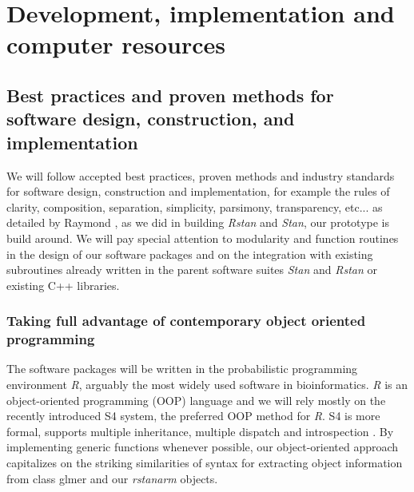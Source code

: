 \documentclass[11pt,notitlepage]{article}
\begin{document}
\section*{Development, implementation and computer resources}

\subsection*{Best practices and proven methods for software design, construction, and implementation}
We will follow accepted best practices, proven methods and industry standards for software design, construction and implementation, for example the rules of clarity, composition, separation, simplicity, parsimony, transparency, etc... as detailed by Raymond \cite{Raymond2003art}, as we did in building \textit{Rstan} and \textit{Stan}, our  prototype is build around. We will pay special attention to modularity and function routines in the design of our software packages and on the integration with existing subroutines already written in the parent software suites \textit{Stan} and \textit{Rstan} or existing C++ libraries. 

\subsubsection*{Taking full advantage of contemporary object oriented programming}
The software packages will be written in the probabilistic programming environment \textit{R}, arguably the most widely used software in bioinformatics. \textit{R} is an object-oriented programming (OOP) language and we will rely mostly on the recently introduced S4 system, the preferred OOP method for \textit{R}. S4 is more formal, supports multiple inheritance, multiple dispatch and introspection \cite{Chambers2014object}. By implementing generic functions whenever possible, our object-oriented approach capitalizes on the striking similarities of syntax for extracting object information from class glmer and our \textit{rstanarm} objects. 
\end{document}

